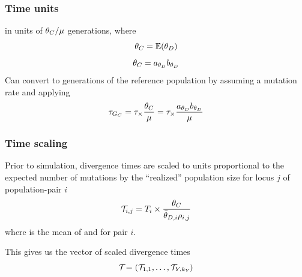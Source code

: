 \begin{frame}[noframenumbering]
    \frametitle{Time units}
    \divTime{} in units of $\theta_{C}/\mu$ generations, where
    \[
    \myTheta{C} = \mathbb{E}(\descendantTheta{}{})
    \]
    \[
    \myTheta{C} = \gammaShape{\descendantTheta{}{}}\gammaScale{\descendantTheta{}{}}
    \]
    Can convert to generations of the reference population by assuming a 
    mutation rate and applying
    \[
    \divTime{G_C} = \divTime \times \frac{\myTheta{C}}{\mutationRate} = \divTime
    \times \frac{
    \gammaShape{\descendantTheta{}{}}\gammaScale{\descendantTheta{}{}}}
    {\mutationRate}
    \]
\end{frame}

\begin{frame}[noframenumbering]
    \frametitle{Time scaling}
    Prior to simulation, divergence times are scaled to units proportional to
    the expected number of mutations by the ``realized'' population size for
    locus $j$ of population-pair $i$ 
    \[
    \divTimeScaled{i}{j} = \divTimeMap{i} \times \frac{\myTheta{C}}{
        \descendantThetaMean{i} \ploidyScalar{i}{j}}
    \]
    where  is the mean of  and
     for pair $i$.

    This gives us the vector of scaled divergence times
    \[
        \divTimeScaledVector = (\divTimeScaled{1}{1}, \ldots,
        \divTimeScaled{\npairs{}}{\nloci{\npairs{}}})
    \]
\end{frame}



